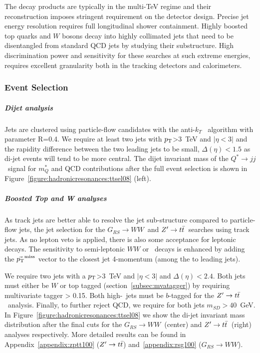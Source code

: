 \documentclass{cernrep}
\newcommand*{\zptt}{\ensuremath{Z^{\prime} \rightarrow \ttbar}}
\newcommand*{\qjj}{\ensuremath{Q^{*} \rightarrow jj}}
\newcommand*{\rsg}{\ensuremath{G_{RS} \rightarrow WW}}
\newcommand*{\metvec}{\vec{\pt}^{\textrm{miss}}}
\begin{document}
The decay products are typically in the multi-TeV regime and their reconstruction imposes stringent requirement on the detector design. Precise jet energy resolution requires full longitudinal shower containment. Highly boosted top quarks and $W$ bosons decay into highly collimated jets that need to  be disentangled from standard QCD jets by studying their substructure. High discrimination power and sensitivity for these searches at such extreme energies, requires excellent granularity both in the tracking detectors and calorimeters.

\subsubsection{Event Selection}

\subparagraph{Dijet analysis}

Jets are clustered using particle-flow candidates with the anti-$k_T$~\cite{Cacciari:2008gp} algorithm with parameter R=0.4. We require at least two jets with $p_{\text{T}}$>3~TeV and $|\eta<3|$ and the rapidity difference between the two leading jets to be small, $\Delta(\eta)<1.5$ as di-jet events will tend to be more central. The dijet invariant mass of the \qjj\ signal for $m_Q^{*}$ and QCD contributions after the full event selection is shown in Figure~\ref{figure:hadronicresonances:ttsel08} (left).

\subparagraph{Boosted Top and W analyses}

As track jets are better able to resolve the jet sub-structure compared to particle-flow jets, the jet selection for the \rsg\ and \zptt\ searches using track jets. As no lepton veto is applied, there is also some acceptance for leptonic decays. The sensitivity to semi-leptonic $WW$ or \ttbar\ decays is enhanced by adding the $\metvec$ vector to the closest jet 4-momentum (among the to leading jets).

We require two jets with a $p_{\text{T}}$>3~TeV and $|\eta<3|$ and $\Delta(\eta)<2.4$. Both jets must either be $W$ or top tagged (section~\ref{subsec:mvatagger}) by requiring multivariate tagger > 0.15. Both high-\pt\ jets must be $b$-tagged for the \zptt\ analysis. Finally, to further reject QCD, we require for both jets $m_{SD}>40$~GeV. In Figure~\ref{figure:hadronicresonances:ttsel08} we show the di-jet invariant mass distribution after the final cuts for the \rsg\ (center) and \zptt\ (right) analyses respectively.
\newline
More detailed results can be found in Appendix~\ref{appendix:zptt100} (\zptt) and~\ref{appendix:rsg100} (\rsg).
\end{document}
